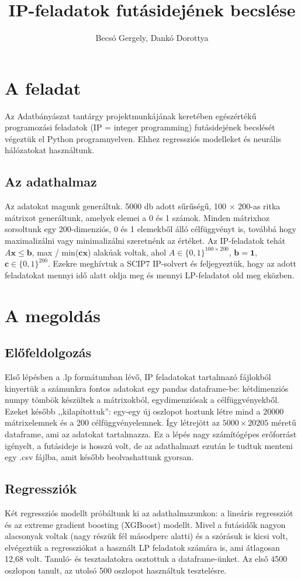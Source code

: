 \documentclass[12pt]{article}
\theoremstyle{plain}%
\theoremstyle{definition}%
\begin{document}
\title{IP-feladatok futásidejének becslése} %
\author{Becsó Gergely, Dankó Dorottya}
\maketitle
\section{A feladat}
Az Adatbányászat tantárgy projektmunkájának keretében egészértékű programozási feladatok (IP = integer programming) futásidejének becslését végeztük el Python programnyelven. Ehhez regressziós modelleket és neurális hálózatokat használtunk.
\subsection{Az adathalmaz}
Az adatokat magunk generáltuk. 5000 db adott sűrűségű, 100 $\times$ 200-as ritka mátrixot generáltunk, amelyek elemei a 0 és 1 számok. Minden mátrixhoz sorsoltunk egy 200-dimenziós, 0 és 1 elemekből álló célfüggvényt is, továbbá hogy maximalizálni vagy minimalizálni szeretnénk az értéket. Az IP-feladatok tehát $A \mathbf{x} \leq \mathbf{b}$, max / min($\mathbf{cx}$) alakúak voltak, ahol $A \in \{0,1\}^{100 \times 200}$, $\mathbf{b} = \mathbf{1}$, $\mathbf{c} \in \{0, 1 \}^{200}$. Ezekre meghívtuk a SCIP7 IP-solvert és feljegyeztük, hogy az adott feladatokat mennyi idő alatt oldja meg és mennyi LP-feladatot old meg eközben.
\section{A megoldás}
\subsection{Előfeldolgozás}
Első lépésben a .lp formátumban lévő, IP feladatokat tartalmazó fájlokból kinyertük a számunkra fontos adatokat egy pandas dataframe-be: kétdimenziós numpy tömbök készültek a mátrixokból, egydimenziósak a célfüggvényekből. Ezeket később ,,kilapítottuk'': egy-egy új oszlopot hoztunk létre mind a 20000 mátrixelemnek és a 200 célfüggvényelemnek. Így létrejött az $5000\times 20205$ méretű dataframe, ami az adatokat tartalmazza. Ez a lépés nagy számítógépes erőforrást igényelt, a futásideje is hosszú volt, de az adathalmazt ezután le tudtuk menteni egy .csv fájlba, amit később beolvashattunk gyorsan.
\subsection{Regressziók}
Két regressziós modellt próbáltunk ki az adathalmazunkon: a lineáris regressziót és az extreme gradient boosting (XGBoost) modellt. Mivel a futásidők nagyon alacsonyak voltak (nagy részük fél másodperc alatti) és a szórásuk is kicsi volt, elvégeztük a regressziókat a használt LP feladatok számára is, ami átlagosan 12,68 volt. Tanuló- és tesztadatokra osztottuk a dataframe-ünket. Az első 4500 oszlopon tanult, az utolsó 500 oszlopot használtuk tesztelésre. 
\end{document}
